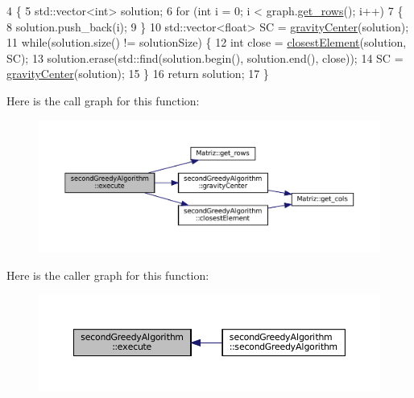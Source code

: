 \begin{DoxyCode}
4 \{
5   std::vector<int> solution;
6   \textcolor{keywordflow}{for} (\textcolor{keywordtype}{int} i = 0; i < graph.\hyperlink{classMatriz_a6b18342f8c083baece693ff41185a206}{get\_rows}(); i++)
7   \{
8     solution.push\_back(i);
9   \}
10   std::vector<float> SC = \hyperlink{classsecondGreedyAlgorithm_a95e094bd3f2ee22127eaaf734c2cee8a}{gravityCenter}(solution);
11   \textcolor{keywordflow}{while}(solution.size() != solutionSize) \{
12     \textcolor{keywordtype}{int} close = \hyperlink{classsecondGreedyAlgorithm_ad34d30fcba1f3d71dc67ea6b12d5d0b8}{closestElement}(solution, SC);
13     solution.erase(std::find(solution.begin(), solution.end(), close));
14     SC = \hyperlink{classsecondGreedyAlgorithm_a95e094bd3f2ee22127eaaf734c2cee8a}{gravityCenter}(solution);
15   \}
16   \textcolor{keywordflow}{return} solution;
17 \}
\end{DoxyCode}
Here is the call graph for this function\+:
\nopagebreak
\begin{figure}[H]
\begin{center}
\leavevmode
\includegraphics[width=350pt]{classsecondGreedyAlgorithm_a119a730116003d00438179ccf4e2cafd_cgraph}
\end{center}
\end{figure}
Here is the caller graph for this function\+:
\nopagebreak
\begin{figure}[H]
\begin{center}
\leavevmode
\includegraphics[width=350pt]{classsecondGreedyAlgorithm_a119a730116003d00438179ccf4e2cafd_icgraph}
\end{center}
\end{figure}
\mbox{\label{classsecondGreedyAlgorithm_a95e094bd3f2ee22127eaaf734c2cee8a}} 
